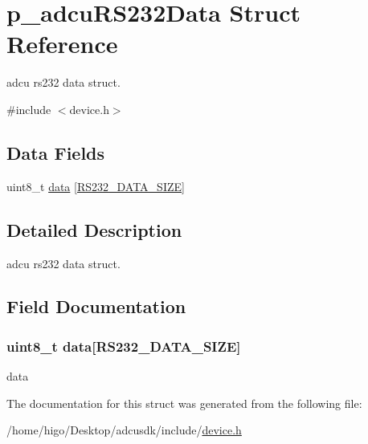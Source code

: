 \hypertarget{structp__adcuRS232Data}{}\section{p\+\_\+adcu\+R\+S232\+Data Struct Reference}
\label{structp__adcuRS232Data}


adcu rs232 data struct.  




{\ttfamily \#include $<$device.\+h$>$}

\subsection*{Data Fields}
\begin{DoxyCompactItemize}
\item 
uint8\+\_\+t \hyperlink{structp__adcuRS232Data_add44b908d31f27690479fb46abb54490}{data} \mbox{[}\hyperlink{device_8h_ab7cc37e6a1411fb4e307828c19533c77}{R\+S232\+\_\+\+D\+A\+T\+A\+\_\+\+S\+I\+ZE}\mbox{]}
\end{DoxyCompactItemize}


\subsection{Detailed Description}
adcu rs232 data struct. 

\subsection{Field Documentation}
\subsubsection[{\texorpdfstring{data}{data}}]{\setlength{\rightskip}{0pt plus 5cm}uint8\+\_\+t data\mbox{[}{\bf R\+S232\+\_\+\+D\+A\+T\+A\+\_\+\+S\+I\+ZE}\mbox{]}}\hypertarget{structp__adcuRS232Data_add44b908d31f27690479fb46abb54490}{}\label{structp__adcuRS232Data_add44b908d31f27690479fb46abb54490}
data 

The documentation for this struct was generated from the following file\+:\begin{DoxyCompactItemize}
\item 
/home/higo/\+Desktop/adcusdk/include/\hyperlink{device_8h}{device.\+h}\end{DoxyCompactItemize}
